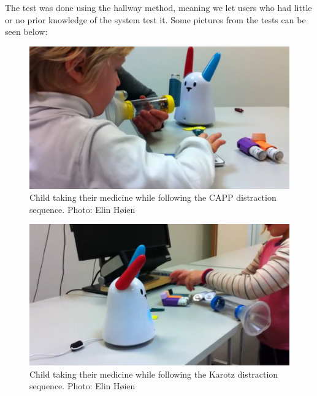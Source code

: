 The test was done using the hallway method, meaning we let users who had little or no prior knowledge of the system test it. Some pictures from the tests can be seen below:
\begin{figure}
	\centering
		\includegraphics[width=\linewidth]{Pictures/usabilitytestCAPP}
	\caption[Usability test CAPP distraction]{Child taking their medicine while following the CAPP distraction sequence. Photo: Elin Høien}
	\label{fig:cappdistraction}
\end{figure}

\begin{figure}
	\centering
		\includegraphics[width=\linewidth]{Pictures/usabilitytestkarotz}
	\caption[Usability test Karotz distraction]{Child taking their medicine while following the Karotz distraction sequence. Photo: Elin Høien}
	\label{fig:karotzdistraction}
\end{figure}

